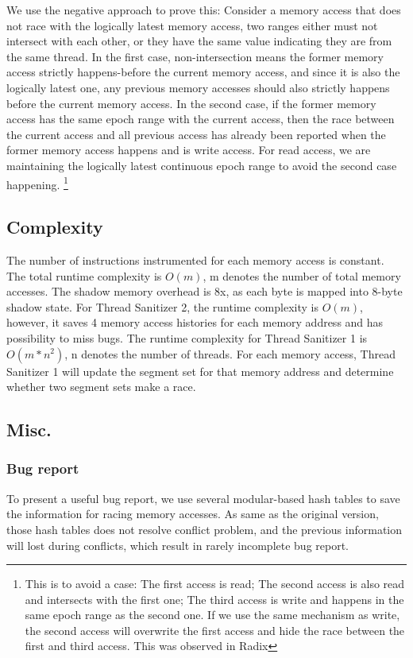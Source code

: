 We use the negative approach to prove this: Consider a memory access that does not race with the logically latest memory access,
two ranges either must not intersect with each other, or they have the same value indicating they are from the same thread.
In the first case, non-intersection means the former memory access strictly happens-before the current memory access, and since
it is also the logically latest one, any previous memory accesses should also strictly happens before the current memory access.
In the second case, if the former memory access has the same epoch range with the current access, then the race between the current access and 
all previous access has already been reported when the former memory access happens and is write access. For read access, we are maintaining
the logically latest continuous epoch range to avoid the second case happening. \footnote{This is to avoid a case: The first access is read; 
The second access is also read and intersects with the first one; The third access is write and happens in the same epoch range as the second one.
If we use the same mechanism as write, the second access will overwrite the first access and hide the race between the first and third access. This
was observed in Radix}

\subsection{Complexity}
The number of instructions instrumented for each memory access is constant. The total runtime complexity is $O(m)$, m denotes the number of total memory
accesses. The shadow memory overhead is 8x, as each byte is mapped into 8-byte shadow state. For Thread Sanitizer 2, the runtime complexity is $O(m)$, however,
it saves 4 memory access histories for each memory address and has possibility to miss bugs. The runtime complexity for Thread Sanitizer 1 is $O(m*n^2)$,
n denotes the number of threads. For each memory access, Thread Sanitizer 1 will update the segment set for that memory address and determine whether two segment
sets make a race.
\subsection{Misc.}
\subsubsection{Bug report}
To present a useful bug report, we use several modular-based hash tables to save the information for racing memory accesses. As same as 
the original version, those hash tables does not resolve conflict problem, and the previous information will lost during conflicts, which result
in rarely incomplete bug report.
